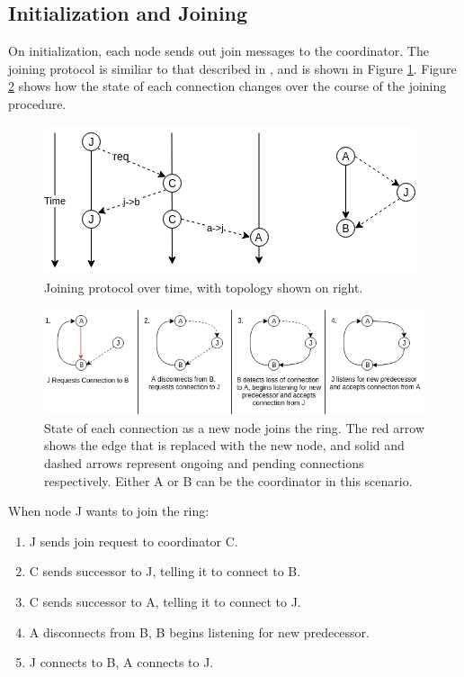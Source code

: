 \documentclass[12pt]{article}
\begin{document}
\subsection{Initialization and Joining}

On initialization, each node sends out join messages to the coordinator. The
joining protocol is similiar to that described in \cite{join}, and is shown in Figure \ref{fig:join}.
Figure \ref{fig:bigjoin} shows how the state of each connection changes over the course of
the joining procedure.

\begin{figure}[!ht]
\centering
  \centering
  \includegraphics[width=.6\linewidth]{images/join}
  \caption{Joining protocol over time, with topology shown on right.}
\label{fig:join}
\end{figure}

\begin{figure}[!ht]
  \centering
  \includegraphics[width=\linewidth]{images/bigflow}
  \caption{State of each connection as a new node joins the ring. The red arrow
shows the edge that is replaced with the new node, and solid and dashed
arrows represent ongoing and pending connections respectively. Either A or
B can be the coordinator in this scenario.}
\label{fig:bigjoin}
\end{figure}
\FloatBarrier

\noindent When node J wants to join the ring:
\begin{enumerate}
    \item J sends join request to coordinator C.
    \item C sends successor to J, telling it to connect to B.
    \item C sends successor to A, telling it to connect to J. 
    \item A disconnects from B, B begins listening for new predecessor.
    \item J connects to B, A connects to J.
\end{enumerate}
\end{document}
